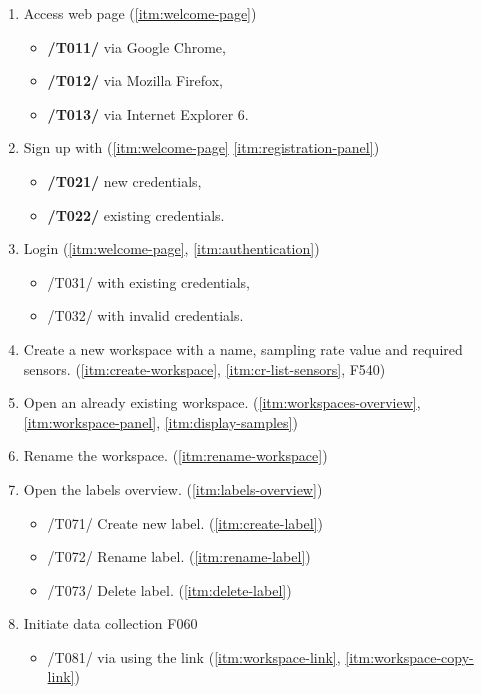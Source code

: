 \begin{enumerate}[{label = \textbf{/T{\protect\twodigits{\arabic{enumi}}}0/}, leftmargin = *}]
    \item Access web page (\ref{itm:welcome-page}) %
    \begin{itemize}
        \item \textbf{/T011/} via Google Chrome,
        \item \textbf{/T012/} via Mozilla Firefox,
        \item \textbf{/T013/} via Internet Explorer 6.
    \end{itemize}
    \item Sign up with (\ref{itm:welcome-page} \ref{itm:registration-panel})
    \begin{itemize}
        \item \textbf{/T021/} new credentials,
        \item \textbf{/T022/} existing credentials.
    \end{itemize}
    \item Login (\ref{itm:welcome-page}, \ref{itm:authentication})
    \begin{itemize}
        \item /T031/ with existing credentials,
        \item /T032/ with invalid credentials.
    \end{itemize}
    \item Create a new workspace with a name, sampling rate value and required sensors. (\ref{itm:create-workspace}, \ref{itm:cr-list-sensors}, F540)
    \item Open an already existing workspace. (\ref{itm:workspaces-overview}, \ref{itm:workspace-panel}, \ref{itm:display-samples})
    \item Rename the workspace. (\ref{itm:rename-workspace})
    \item Open the labels overview. (\ref{itm:labels-overview})
    \begin{itemize}
        \item /T071/ Create new label. (\ref{itm:create-label})
        \item /T072/ Rename label. (\ref{itm:rename-label})
        \item /T073/ Delete label. (\ref{itm:delete-label})
    \end{itemize}
    \item Initiate data collection F060
    \begin{itemize}
        \item /T081/ via using the link (\ref{itm:workspace-link}, \ref{itm:workspace-copy-link})

\end{itemize}
\end{enumerate}
